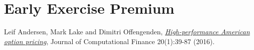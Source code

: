 \documentclass[12pt]{article}
\begin{document}
  \section{Early Exercise Premium}




\begin{thebibliography}{99}
    Leif Andersen, Mark Lake and Dimitri Offengenden,
    \href{https://www.risk.net/journal-of-computational-finance/2464632/high-performance-american-option-pricing}
    {\it High-performance American option pricing},
    Journal of Computational Finance 20(1):39-87 (2016).
\end{thebibliography}
\end{document}
